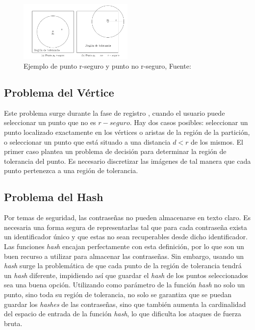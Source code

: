 \begin{figure}[h]
			\centering
			\includegraphics[width=0.5\textwidth]{punto-r-seguro.png}			
			\caption{Ejemplo de punto r-seguro y punto no r-seguro, Fuente: \cite{legon2019nuevo} }
		\end{figure}
		
	
\subsection{Problema del Vértice}
Este problema surge durante la fase de registro \cite{legon2019nuevo, birget2006graphical, borrego2018debilidades}, cuando el usuario puede seleccionar un punto que no es $r-seguro$. Hay dos casos posibles: seleccionar un punto localizado exactamente en los vértices o aristas de la región de la partición, o seleccionar un punto que está situado a una distancia \(d < r\) de los mismos. El primer caso plantea un problema de decisión para determinar la región de tolerancia del punto. Es necesario discretizar las imágenes de tal manera que cada punto pertenezca a una región de tolerancia.
	
\subsection{Problema del Hash}
Por temas de seguridad, las contraseñas no pueden almacenarse en texto claro. Es necesaria una forma segura de representarlas tal que para cada contraseña exista un identificador único y que estas no sean recuperables desde dicho identificador. Las funciones \textit{hash} \cite{legon2019nuevo, borrego2018debilidades} encajan perfectamente con esta definición, por lo que son un buen recurso a utilizar para almacenar las contraseñas. Sin embargo, usando un \textit{hash} surge la problemática de que cada punto de la región de tolerancia tendrá un \textit{hash} diferente, impidiendo así que guardar el \textit{hash} de los puntos seleccionados sea una buena opción. Utilizando como parámetro de la función \textit{hash} no solo un punto, sino toda su región de tolerancia, no solo se garantiza que se puedan guardar los \textit{hashes} de las contraseñas, sino que también aumenta la cardinalidad del espacio de entrada de la función \textit{hash}, lo que dificulta los ataques de fuerza bruta.
	
